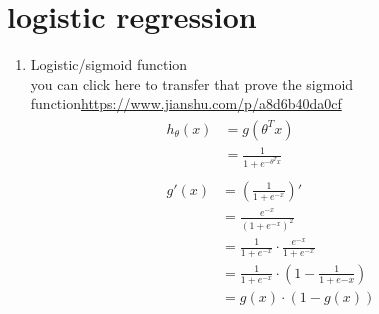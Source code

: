 \documentclass[12pt]{ctexart}%
\begin{document}
	\section{\quad logistic regression}
		\begin{enumerate}
			\item Logistic/sigmoid function\\
				you can click here to transfer that prove the sigmoid function\url{https://www.jianshu.com/p/a8d6b40da0cf}
				\begin{align}
					\begin{split}
						h_\theta(x) &= g(\theta^T x) \\
									&= \frac{1}{1+e^{-\theta^T x}}
					\end{split}\\
					\begin{split}
						g'(x) &= (\frac{1}{1+e^{-x}})' \\
							  &= \frac{e^{-x}}{(1+e^{-x})^2}\\
							  &= \frac{1}{1+e^{-x}}\cdot\frac{e^{-x}}{1+e^{-x}}\\
							  &= \frac{1}{1+e^{-x}}\cdot(1 - \frac{1}{1+e{-x}})\\
							  &= g(x)\cdot (1-g(x))
					\end{split}\\
				\end{align}
			

\end{enumerate}
\end{document}
